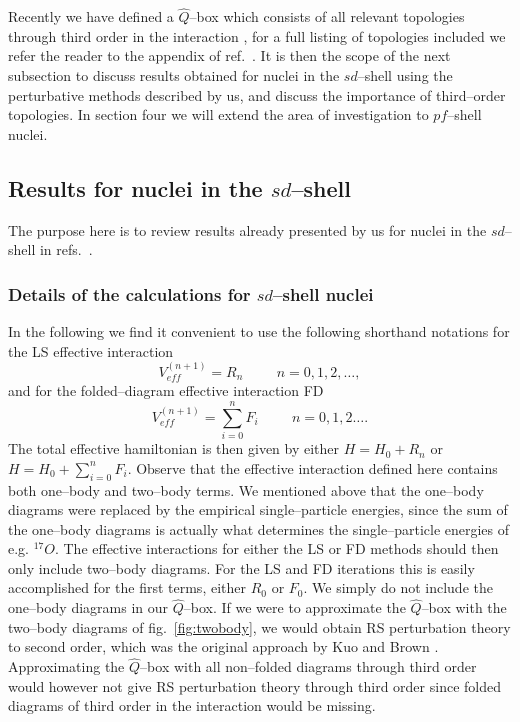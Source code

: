 Recently we have defined a $\hat{Q}$--box which consists of all relevant topologies
through third order in the interaction \cite{hom92,heho92}, for
a full listing of topologies included we refer the reader to the
appendix of ref.\ \cite{hom92}.
It is then the scope of the next
subsection to discuss results obtained for nuclei in the $sd$--shell using the perturbative
methods described by us, and discuss the importance of third--order topologies.
In section four we will extend the area of investigation to $pf$--shell nuclei.



\subsection{Results for nuclei in the $sd$--shell}
The purpose here is to review results already presented by us for nuclei
in the $sd$--shell in refs.\ \cite{hom92,homs90,homsk91}.
\subsubsection{Details of the calculations for $sd$--shell nuclei}
In the following we find it convenient to use the
following shorthand notations for the LS effective interaction
\[
V_{eff}^{(n+1)} = R_n \hspace{1cm} n=0,1,2, \dots ,
\]
and for the folded--diagram effective interaction FD
\[
V_{eff}^{(n+1)}= \sum_{i=0}^{n}F_i \hspace{1cm} n=0, 1, 2 \dots .
\]
The total effective hamiltonian is then given by either
$H=H_0 + R_n$ or $H=H_0 +\sum_{i=0}^{n}F_i$. Observe that the effective
interaction defined here contains both one--body and two--body terms.
We mentioned above that the one--body diagrams were replaced by the empirical
single--particle energies, since the sum of the one--body diagrams is actually
what determines the single--particle energies of e.g. $^{17}O$.
The effective interactions for either the LS or FD methods should then only include
two--body diagrams. For the LS and FD iterations this is easily accomplished
for the first terms, either $R_0$ or $F_0$. We simply do not include the one--body
diagrams in our $\hat{Q}$--box. If we were to approximate the $\hat{Q}$--box
with the two--body diagrams of fig.\ \ref{fig:twobody}, we would obtain RS
perturbation theory to second order, which was the original approach by
Kuo and Brown \cite{kb66}. Approximating the $\hat{Q}$--box
with all non--folded diagrams through third order 
would however not give RS perturbation
theory through third order since
folded diagrams of third order in the interaction
would be missing.

